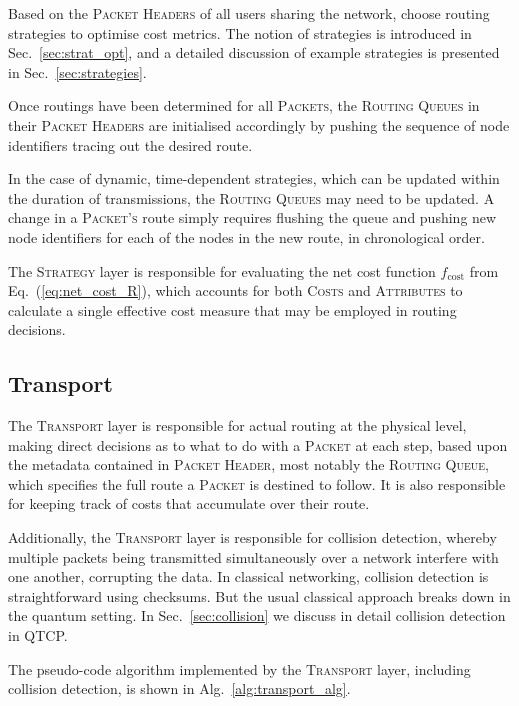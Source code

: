 \documentclass[aps, rmp, twocolumn, amsmath, amssymb, nofootinbib, superscriptaddress, longbibliography, floatfix, table-of-contents, eqsecnum]{revtex4-1}
\begin{document}
Based on the \textsc{Packet Headers} of all users sharing the network, choose routing strategies to optimise cost metrics. The notion of strategies is introduced in Sec.~\ref{sec:strat_opt}, and a detailed discussion of example strategies is presented in Sec.~\ref{sec:strategies}.

Once routings have been determined for all \textsc{Packets}, the \textsc{Routing Queues} in their \textsc{Packet Headers} are initialised accordingly by pushing the sequence of node identifiers tracing out the desired route.

In the case of dynamic, time-dependent strategies, which can be updated within the duration of transmissions, the \textsc{Routing Queues} may need to be updated. A change in a \textsc{Packet's} route simply requires flushing the queue and pushing new node identifiers for each of the nodes in the new route, in chronological order.

The \textsc{Strategy} layer is responsible for evaluating the net cost function $f_\text{cost}$ from Eq.~(\ref{eq:net_cost_R}), which accounts for both \textsc{Costs} and \textsc{Attributes} to calculate a single effective cost measure that may be employed in routing decisions.

%
%

\subsection{Transport} \label{sec:transport} 

The \textsc{Transport} layer is responsible for actual routing at the physical level, making direct decisions as to what to do with a \textsc{Packet} at each step, based upon the metadata contained in \textsc{Packet Header}, most notably the \textsc{Routing Queue}, which specifies the full route a \textsc{Packet} is destined to follow. It is also responsible for keeping track of costs that accumulate over their route.

Additionally, the \textsc{Transport} layer is responsible for collision detection, whereby multiple packets being transmitted simultaneously over a network interfere with one another, corrupting the data. In classical networking, collision detection is straightforward using checksums. But the usual classical approach breaks down in the quantum setting. In Sec.~\ref{sec:collision} we discuss in detail collision detection in QTCP.

The pseudo-code algorithm implemented by the \textsc{Transport} layer, including collision detection, is shown in Alg.~\ref{alg:transport_alg}.
\end{document}
